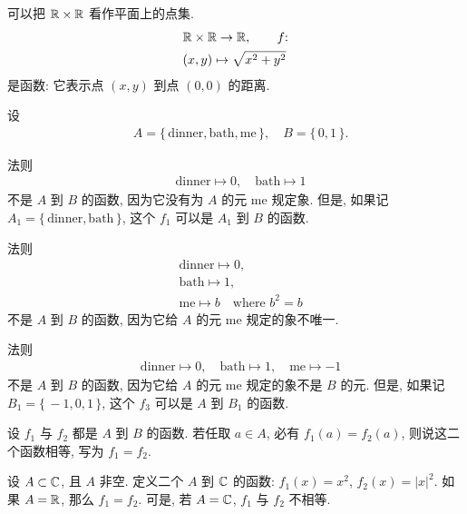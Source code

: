 \begin{example}
    可以把 $\mathbb{R} \times \mathbb{R}$ 看作平面上的点集.
    \begin{align*}
         & \mathbb{R} \times \mathbb{R} \to \mathbb{R},  \tag*{$f$:} \\
         & (x,y) \mapsto \sqrt{x^2+y^2}
    \end{align*}
    是函数: 它表示点 $(x,y)$ 到点 $(0,0)$ 的距离.
\end{example}

\begin{example}
    设
    \begin{align*}
         & A = \{\, \text{dinner}, \text{bath}, \text{me} \,\}, \quad B = \{\, 0,1 \,\}.
    \end{align*}

    法则
    \begin{align*}
         & \text{dinner} \mapsto 0, \quad \text{bath} \mapsto 1 \tag*{$f_1$:}
    \end{align*}
    不是 $A$ 到 $B$ 的函数, 因为它没有为 $A$ 的元 $\text{me}$ 规定象. 但是, 如果记 $A_1 = \{\, \text{dinner}, \text{bath} \,\}$, 这个 $f_1$ 可以是 $A_1$ 到 $B$ 的函数.

    法则
    \begin{align*}
         & \text{dinner} \mapsto 0, \tag*{$f_2$:}          \\
         & \text{bath} \mapsto 1,                          \\
         & \text{me} \mapsto b \quad \text{where } b^2 = b
    \end{align*}
    不是 $A$ 到 $B$ 的函数, 因为它给 $A$ 的元 $\text{me}$ 规定的象不唯一.

    法则
    \begin{align*}
         & \text{dinner} \mapsto 0, \quad
        \text{bath} \mapsto 1, \quad
        \text{me} \mapsto -1 \tag*{$f_3$:}
    \end{align*}
    不是 $A$ 到 $B$ 的函数, 因为它给 $A$ 的元 $\text{me}$ 规定的象不是 $B$ 的元. 但是, 如果记 $B_1 = \{\, -1,0,1 \,\}$, 这个 $f_3$ 可以是 $A$ 到 $B_1$ 的函数.
\end{example}

\begin{definition}
    设 $f_1$ 与 $f_2$ 都是 $A$ 到 $B$ 的函数. 若任取 $a \in A$, 必有 $f_1 (a) = f_2 (a)$, 则说这二个函数相等, 写为 $f_1 = f_2$.
\end{definition}

\begin{example}
    设 $A \subset \mathbb{C}$, 且 $A$ 非空. 定义二个 $A$ 到 $\mathbb{C}$ 的函数: $f_1 (x) = x^2$, $f_2 (x) = |x|^2$. 如果 $A = \mathbb{R}$, 那么 $f_1 = f_2$. 可是, 若 $A = \mathbb{C}$, $f_1$ 与 $f_2$ 不相等.
\end{example}

